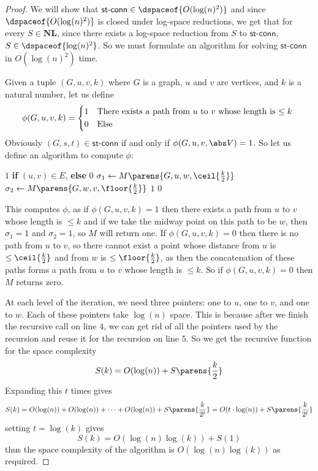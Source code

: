 \documentclass[10pt]{article}
\def\stconn{\textsf{st-conn}}
\def\NL{\mathbf{NL}}
\begin{document}
\begin{proof}

    We will show that $\stconn\in\dspaceof{O(\log(n)^2)}$ and since $\dspaceof{O(\log(n)^2)}$ is closed under log-space reductions, we get that for every $S\in\NL$, since there exists a log-space reduction
    from $S$ to $\stconn$, $S\in\dspaceof{\log(n)^2}$.
    So we must formulate an algorithm for solving $\stconn$ in $O(\log(n)^2)$ time.

    Given a tuple $(G,u,v,k)$ where $G$ is a graph, $u$ and $v$ are vertices, and $k$ is a natural number, let us define
    \[ \phi(G,u,v,k) = \begin{cases*} 1 & There exists a path from $u$ to $v$ whose length is $\leq k$ \\ 0 & Else \end{cases*} \]
    Obviously $(G,s,t)\in\stconn$ if and only if $\phi(G,u,v,\abs V)=1$.
    So let us define an algorithm to compute $\phi$:

    \algorithm
            \Return $1$ \textbf{if} $(u,v)\in E$, \textbf{else} $0$
                \State $\sigma_1\gets M\parens{G,u,w,\ceil{\frac k2}}$
                \State $\sigma_2\gets M\parens{G,w,v,\floor{\frac k2}}$
                 \Return $1$
            \EndFor
            \State\Return $0$
        \EndFunc
    \ealgorithm

    This computes $\phi$, as if $\phi(G,u,v,k)=1$ then there exists a path from $u$ to $v$ whose length is $\leq k$ and if we take the midway point on this path to be $w$, then $\sigma_1=1$ and
    $\sigma_2=1$, so $M$ will return one.
    If $\phi(G,u,v,k)=0$ then there is no path from $u$ to $v$, so there cannot exist a point whose distance from $u$ is $\leq\ceil{\frac k2}$ and from $w$ is $\leq\floor{\frac k2}$, as then the
    concatenation of these paths forms a path from $u$ to $v$ whose length is $\leq k$.
    So if $\phi(G,u,v,k)=0$ then $M$ returns zero.

    At each level of the iteration, we need three pointers: one to $u$, one to $v$, and one to $w$.
    Each of these pointers take $\log(n)$ space.
    This is because after we finish the recursive call on line $4$, we can get rid of all the pointers used by the recursion and reuse it for the recursion on line $5$.
    So we get the recursive function for the space complexity
    \[ S(k) = O(\log(n)) + S\parens{\frac k2} \]
    Expanding this $t$ times gives
    \[ S(k) = O(\log(n)) + O(\log(n)) + \cdots + O(\log(n)) + S\parens{\frac k{2^t}} = O(t\cdot\log(n)) + S\parens{\frac k{2^t}} \]
    setting $t=\log(k)$ gives
    \[ S(k) = O(\log(n)\log(k)) + S(1) \]
    thus the space complexity of the algorithm is $O(\log(n)\log(k))$ as required.


\end{proof}
\end{document}
